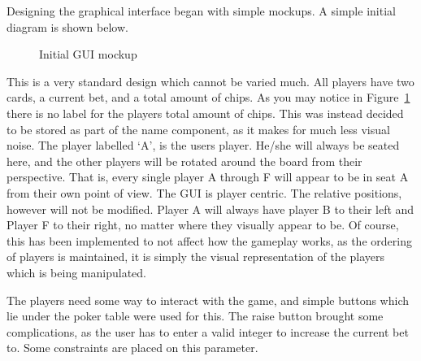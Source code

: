 Designing the graphical interface began with simple mockups. A simple
initial diagram is shown below.

\begin{figure}[h]
    \caption{Initial GUI mockup}%
    \label{fig:initialgui}
\end{figure}

This is a very standard design which cannot be varied much. All players have
two cards, a current bet, and a total amount of chips. As you may notice
in Figure~\ref{fig:initialgui} there is no label for the players total amount
of chips. This was instead decided to be stored as part of the name component,
as it makes for much less visual noise. The player labelled `A', is the
users player. He/she will always be seated here, and the other players will
be rotated around the board from their perspective. That is, every single
player A through F will appear to be in seat A from their own point of view.
The GUI is player centric. The relative positions, however will not be 
modified. Player A will always have player B to their left and Player F to 
their right, no matter where they visually appear to be. Of course, this has 
been implemented to not affect how the gameplay works, as the ordering of 
players is maintained, it is simply the visual representation of the players 
which is being manipulated.

The players need some way to interact with the game, and simple buttons which 
lie under the poker table were used for this. The raise button brought some 
complications, as the user has to enter a valid integer to increase the current
bet to. Some constraints are placed on this parameter.

